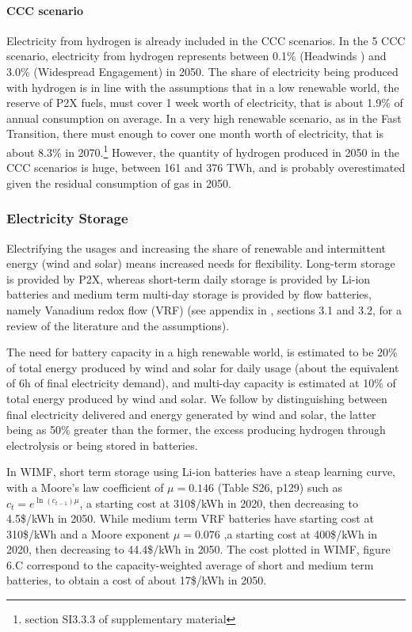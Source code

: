 \paragraph{CCC scenario} Electricity from hydrogen is already included in the CCC scenarios. In the 5 CCC scenario, electricity from hydrogen represents between 0.1\% (Headwinds
) and 3.0\% (Widespread Engagement) in 2050. The share of electricity being produced with hydrogen is in line with the \cite{wayEmpiricallyGroundedTechnology2022} assumptions that in a low renewable world, the reserve of P2X fuels, must cover 1 week worth of electricity, that is about 1.9\% of annual consumption on average. In a very high renewable scenario, as in the Fast Transition, there must enough to cover one month worth of electricity, that is about 8.3\% in 2070.\footnote{section SI3.3.3 of \cite{wayEmpiricallyGroundedTechnology2022} supplementary material}   However, the quantity of hydrogen produced in 2050 in the CCC scenarios is huge, between 161 and 376 TWh, and is probably overestimated given the residual consumption of gas in 2050. 


\subsubsection{Electricity Storage}

Electrifying the usages and increasing the share of renewable and intermittent energy (wind and solar) means increased needs for flexibility. Long-term storage is provided by P2X, whereas short-term daily storage is provided by Li-ion batteries and medium term multi-day storage is provided by flow batteries, namely Vanadium redox flow (VRF) (see appendix in \cite{wayEmpiricallyGroundedTechnology2022}, sections 3.1 and 3.2, for a review of the literature and the assumptions).

The need for battery capacity in a high renewable world, is estimated to be 20\% of total energy produced by wind and solar for daily usage (about the equivalent of 6h of final electricity demand), and multi-day capacity is estimated at 10\% of total energy produced by wind and solar. We follow \cite{wayEmpiricallyGroundedTechnology2022} by distinguishing between final electricity delivered and energy generated by wind and solar, the latter being as 50\% greater than the former, the excess producing hydrogen through electrolysis or being stored in batteries. 

In WIMF, short term storage using Li-ion batteries have a steap learning curve, with a Moore's law coefficient of $\mu=0.146$ (Table S26, p129) such as $c_t=e^{\ln(c_{t-1})\mu}$, a starting cost at 310\$/kWh in 2020, then decreasing to 4.5\$/kWh in 2050. While medium term VRF batteries have starting cost at 310\$/kWh and a Moore exponent $\mu=0.076$ ,a starting cost at 400\$/kWh in 2020, then decreasing to 44.4\$/kWh in 2050. The cost plotted in WIMF, figure 6.C correspond to the capacity-weighted average of short and medium term batteries, to obtain a cost of about 17\$/kWh in 2050.

